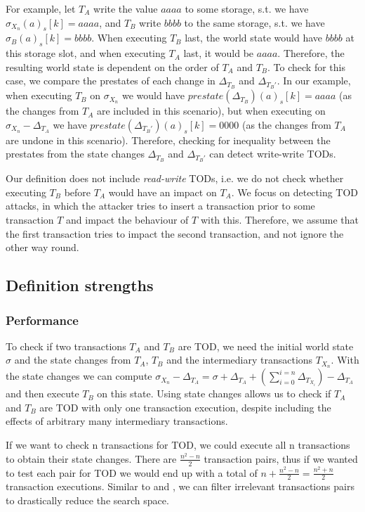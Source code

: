 \documentclass[draft,final]{vutinfth} %
\begin{document}
For example, let $T_A$ write the value $aaaa$ to some storage, s.t. we have $\sigma_{X_n}(a)_s[k] = aaaa$, and $T_B$ write $bbbb$ to the same storage, s.t. we have $\sigma_B(a)_s[k] = bbbb$. When executing $T_B$ last, the world state would have $bbbb$ at this storage slot, and when executing $T_A$ last, it would be $aaaa$. Therefore, the resulting world state is dependent on the order of $T_A$ and $T_B$. To check for this case, we compare the prestates of each change in $\Delta_{T_B}$ and $\Delta_{T_B\prime}$. In our example, when executing $T_B$ on $\sigma_{X_n}$ we would have $prestate(\Delta_{T_B})(a)_s[k] = aaaa$ (as the changes from $T_A$ are included in this scenario), but when executing on $\sigma_{X_n} - \Delta_{T_A}$ we have $prestate(\Delta_{T_B\prime})(a)_s[k] = 0000$ (as the changes from $T_A$ are undone in this scenario). Therefore, checking for inequality between the prestates from the state changes $\Delta_{T_B}$ and $\Delta_{T_B\prime}$ can detect write-write TODs.

Our definition does not include \emph{read-write} TODs, i.e. we do not check whether executing $T_B$ before $T_A$ would have an impact on $T_A$. We focus on detecting TOD attacks, in which the attacker tries to insert a transaction prior to some transaction $T$ and impact the behaviour of $T$ with this. Therefore, we assume that the first transaction tries to impact the second transaction, and not ignore the other way round.

\subsection{Definition strengths}

\subsubsection{Performance}

To check if two transactions $T_A$ and $T_B$ are TOD, we need the initial world state $\sigma$ and the state changes from $T_A$, $T_B$ and the intermediary transactions $T_{X_n}$. With the state changes we can compute $\sigma_{X_n} - \Delta_{T_A} = \sigma + \Delta_{T_A} + (\sum_{i=0}^{i=n} \Delta_{T_{X_i}}) - \Delta_{T_A}$ and then execute $T_B$ on this state. Using state changes allows us to check if $T_A$ and $T_B$ are TOD with only one transaction execution, despite including the effects of arbitrary many intermediary transactions.

If we want to check n transactions for TOD, we could execute all n transactions to obtain their state changes. There are $\frac{n^2 - n}{2}$ transaction pairs, thus if we wanted to test each pair for TOD we would end up with a total of $n + \frac{n^2 - n}{2} = \frac{n^2 + n}{2}$ transaction executions. Similar to \cite{torres_frontrunner_2021} and \cite{zhang_combatting_2023}, we can filter irrelevant transactions pairs to drastically reduce the search space.
\end{document}
